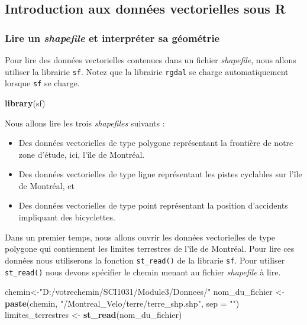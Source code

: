 \documentclass[
  12pt,
]{krantz}
\newenvironment{Shaded}{\begin{snugshade}}{\end{snugshade}}
\newcommand{\DataTypeTok}[1]{\textcolor[rgb]{0.13,0.29,0.53}{#1}}
\newcommand{\KeywordTok}[1]{\textcolor[rgb]{0.13,0.29,0.53}{\textbf{#1}}}
\newcommand{\NormalTok}[1]{#1}
\newcommand{\StringTok}[1]{\textcolor[rgb]{0.31,0.60,0.02}{#1}}
\providecommand{\tightlist}{%
  \setlength{\itemsep}{0pt}\setlength{\parskip}{0pt}}
\begin{document}
\hypertarget{introduction-aux-donnuxe9es-vectorielles-sous-r}{%
\subsection{Introduction aux données vectorielles sous R}\label{introduction-aux-donnuxe9es-vectorielles-sous-r}}

\hypertarget{lire-un-shapefile-et-interpruxe9ter-sa-guxe9omuxe9trie}{%
\subsubsection*{\texorpdfstring{Lire un \emph{shapefile} et interpréter sa géométrie}{Lire un shapefile et interpréter sa géométrie}}\label{lire-un-shapefile-et-interpruxe9ter-sa-guxe9omuxe9trie}}


Pour lire des données vectorielles contenues dans un fichier \emph{shapefile}, nous allons utiliser la librairie \texttt{sf}. Notez que la librairie \texttt{rgdal} se charge automatiquement lorsque \texttt{sf} se charge.

\begin{Shaded}
\begin{Highlighting}[]
\KeywordTok{library}\NormalTok{(sf)}
\end{Highlighting}
\end{Shaded}

Nous allons lire les trois \emph{shapefiles} suivants :

\begin{itemize}
\tightlist
\item
  Des données vectorielles de type polygone représentant la frontière de notre zone d'étude, ici, l'île de Montréal.
\item
  Des données vectorielles de type ligne représentant les pistes cyclables sur l'île de Montréal, et
\item
  Des données vectorielles de type point représentant la position d'accidents impliquant des bicyclettes.
\end{itemize}

Dans un premier temps, nous allons ouvrir les données vectorielles de type polygone qui contiennent les limites terrestres de l'île de Montréal. Pour lire ces données nous utiliserons la fonction \texttt{st\_read()} de la librarie \texttt{sf}. Pour utiliser \texttt{st\_read()} nous devons spécifier le chemin menant au fichier \emph{shapefile} à lire.

\begin{Shaded}
\begin{Highlighting}[]
\NormalTok{chemin<-}\StringTok{"D:/votrechemin/SCI1031/Module3/Donnees/"}
\NormalTok{nom_du_fichier <-}\StringTok{ }\KeywordTok{paste}\NormalTok{(chemin, }\StringTok{"/Montreal_Velo/terre/terre_shp.shp"}\NormalTok{, }\DataTypeTok{sep =} \StringTok{""}\NormalTok{)}
\NormalTok{limites_terrestres <-}\StringTok{ }\KeywordTok{st_read}\NormalTok{(nom_du_fichier)}
\end{Highlighting}
\end{Shaded}
\end{document}
